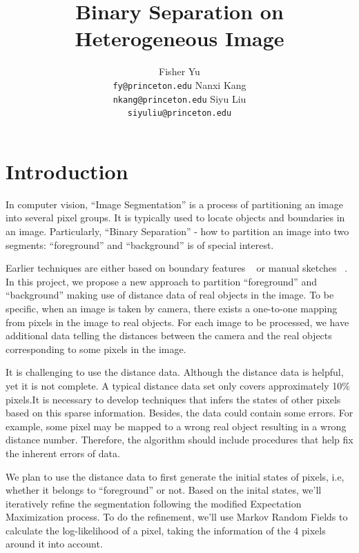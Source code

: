 \documentclass{article} %
\title{Binary Separation on Heterogeneous Image}
\author{
Fisher Yu \\
\texttt{fy@princeton.edu}
\And
Nanxi Kang \\
\texttt{nkang@princeton.edu} 
\And
Siyu Liu\\
\texttt{siyuliu@princeton.edu}
}
\begin{document}
\maketitle


\section{Introduction}


In computer vision, ``Image Segmentation'' is a process of partitioning an
image into several pixel groups. It is typically used to locate
objects and boundaries in an image. Particularly, ``Binary Separation'' -
how to partition an image into two segments: ``foreground''
 and ``background'' is of special interest. 

Earlier techniques are either based on boundary features
~\citep{Kass1988snakes} or manual sketches
~\citep{Boykov2006graph}. In this project, we propose a new
approach to partition ``foreground'' and ``background'' making use of 
distance data of real objects in the image. To be specific, when an
image is taken by camera, there exists a
one-to-one mapping from pixels in the image to real objects. 
For each image to be processed, we have additional data telling the 
distances between the camera and the real objects corresponding to some
 pixels in the image. 

It is challenging to use the distance data. Although the distance data
is helpful, yet it is not complete. A typical distance data set only
covers approximately 10\% pixels.It is necessary to develop techniques
that infers the states of other pixels based on this sparse
information. Besides, the data could contain some errors. For example,
some pixel may be mapped to a wrong real object resulting in a wrong
distance number. Therefore, the algorithm should include procedures
that help fix the inherent errors of data. 

We plan to use the distance data to first
generate the initial states of pixels, i.e,
 whether it belongs to ``foreground'' or not. Based on the inital
 states, we'll iteratively refine the segmentation following the
 modified Expectation Maximization process. To do the refinement,
 we'll use Markov Random Fields to calculate the log-likelihood of a
 pixel, taking the information of the 4 pixels around it into account.
\end{document}
